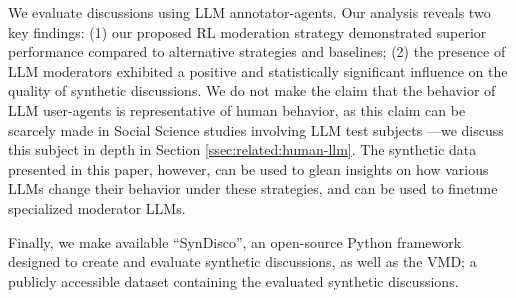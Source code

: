 We evaluate discussions using \ac{LLM} annotator-agents. Our analysis reveals two key findings: (1) our proposed \ac{RL} moderation strategy demonstrated superior performance compared to alternative strategies and baselines; (2) the presence of \ac{LLM} moderators exhibited a positive and statistically significant influence on the quality of synthetic discussions. We do not make the claim that the behavior of \ac{LLM} user-agents is representative of human behavior, as this claim can be scarcely made in Social Science studies involving \ac{LLM} test subjects \cite{rossi_2024}—we discuss this subject in depth in Section \ref{ssec:related:human-llm}. The synthetic data presented in this paper, however, can be used to glean insights on how various \acp{LLM} change their behavior under these strategies, and can be used to finetune specialized moderator \acp{LLM}.

Finally, we make available “SynDisco”, an open-source Python framework designed to create and evaluate synthetic discussions, as well as the \ac{VMD}\datasetlink; a publicly accessible dataset containing the evaluated synthetic discussions. 